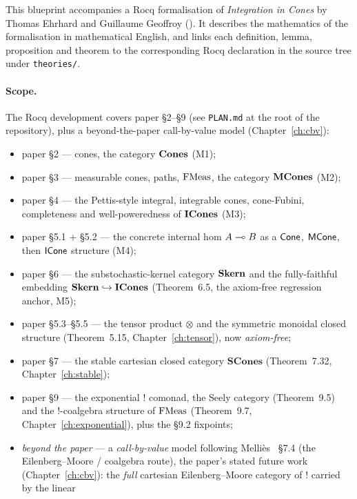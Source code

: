 This blueprint accompanies a Rocq formalisation of \emph{Integration in
Cones} by Thomas Ehrhard and Guillaume Geoffroy
(\cite{ehrhard-geoffroy-icones}). It describes the mathematics of the
formalisation in mathematical English, and links each definition,
lemma, proposition and theorem to the corresponding Rocq declaration
in the source tree under \texttt{theories/}.

\paragraph{Scope.}
The Rocq development covers paper \S2--\S9 (see \texttt{PLAN.md} at the
root of the repository), plus a beyond-the-paper call-by-value model
(Chapter~\ref{ch:cbv}):
\begin{itemize}
  \item paper \S2 --- cones, the category $\mathbf{Cones}$ (M1);
  \item paper \S3 --- measurable cones, paths, $\mathrm{FMeas}$, the
    category $\mathbf{MCones}$ (M2);
  \item paper \S4 --- the Pettis-style integral, integrable cones,
    cone-Fubini, completeness and well-poweredness of $\mathbf{ICones}$ (M3);
  \item paper \S5.1 + \S5.2 --- the concrete internal hom
    $A \multimap B$ as a $\mathsf{Cone}$, $\mathsf{MCone}$, then $\mathsf{ICone}$ structure (M4);
  \item paper \S6 --- the substochastic-kernel category $\mathbf{Skern}$
    and the fully-faithful embedding $\mathbf{Skern} \hookrightarrow \mathbf{ICones}$
    (Theorem~6.5, the axiom-free regression anchor, M5);
  \item paper \S5.3--\S5.5 --- the tensor product $\otimes$ and the
    symmetric monoidal closed structure (Theorem~5.15,
    Chapter~\ref{ch:tensor}), now \emph{axiom-free};
  \item paper \S7 --- the stable cartesian closed category
    $\mathbf{SCones}$ (Theorem~7.32, Chapter~\ref{ch:stable});
  \item paper \S9 --- the exponential $\mathord{!}$ comonad, the Seely
    category (Theorem~9.5) and the $\mathord{!}$-coalgebra structure of
    $\mathrm{FMeas}$ (Theorem~9.7, Chapter~\ref{ch:exponential}), plus the \S9.2
    fixpoints;
  \item \emph{beyond the paper} --- a \emph{call-by-value} model
    following Melli\`es~\cite{mellies-categorical-semantics} \S7.4 (the
    Eilenberg--Moore / coalgebra route), the paper's stated future work
    (Chapter~\ref{ch:cbv}): the \emph{full} cartesian
    Eilenberg--Moore category of $\mathord{!}$ carried by the linear

\end{itemize}

